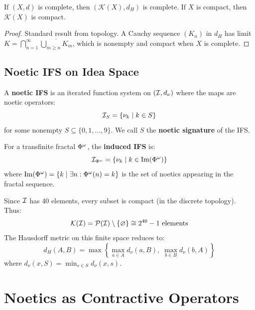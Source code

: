 \begin{proposition}
\label{prop:hyperspace-complete}
If $(X, d)$ is complete, then $(\mathcal{K}(X), d_H)$ is complete. If $X$ is compact, then $\mathcal{K}(X)$ is compact.
\end{proposition}

\begin{proof}
Standard result from topology. A Cauchy sequence $(K_n)$ in $d_H$ has limit $K = \bigcap_{n=1}^\infty \overline{\bigcup_{m \geq n} K_m}$, which is nonempty and compact when $X$ is complete.
\end{proof}

\subsection{Noetic IFS on Idea Space}

\begin{definition}
\label{def:noetic-ifs}
A \textbf{noetic IFS} is an iterated function system on $(\mathcal{I}, d_\nu)$ where the maps are noetic operators:
\[
\mathcal{I}_S = \{\nu_{k} \mid k \in S\}
\]
for some nonempty $S \subseteq \{0, 1, \ldots, 9\}$. We call $S$ the \textbf{noetic signature} of the IFS.
\end{definition}

\begin{definition}
\label{def:fractal-induced-ifs}
For a transfinite fractal $\Phi^{\omega}$, the \textbf{induced IFS} is:
\[
\mathcal{I}_{\Phi^{\omega}} = \{\nu_{k} \mid k \in \mathrm{Im}(\Phi^{\omega})\}
\]
where $\mathrm{Im}(\Phi^{\omega}) = \{k \mid \exists n : \Phi^{\omega}(n) = k\}$ is the set of noetics appearing in the fractal sequence.
\end{definition}

\begin{remark}
\label{rem:finite-idea-space}
Since $\mathcal{I}$ has 40 elements, every subset is compact (in the discrete topology). Thus:
\[
\mathcal{K}(\mathcal{I}) = \mathcal{P}(\mathcal{I}) \setminus \{\varnothing\} \cong 2^{40} - 1 \text{ elements}
\]
The Hausdorff metric on this finite space reduces to:
\[
d_H(A, B) = \max\left\{\max_{a \in A} d_\nu(a, B), \; \max_{b \in B} d_\nu(b, A)\right\}
\]
where $d_\nu(x, S) = \min_{s \in S} d_\nu(x, s)$.
\end{remark}

\section{Noetics as Contractive Operators}
\label{sec:noetics-contractive}

